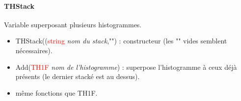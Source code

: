 \documentclass[a4paper]{report}
\begin{document}
\paragraph{THStack}
Variable superposant plusieurs histogrammes.
  \begin{itemize}
   \item THStack((\textcolor{red}{string} \textit{nom du stack},"") : constructeur (les "" vides semblent n\'{e}cessaires).
   \item Add(\textcolor{red}{TH1F} \textit{nom de l'histogramme}) : superpose l'histogramme \`{a} ceux d\'{e}j\`{a} pr\'{e}sents (le dernier stack\'{e} est au dessus).
   \item m\^{e}me fonctions que TH1F.
  \end{itemize}
\end{document}
